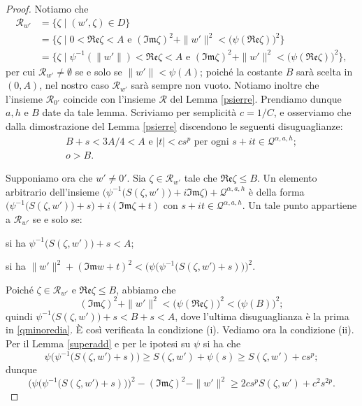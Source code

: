 \begin{proof}
    Notiamo che
    \begin{align*}
        \mathcal{R}_{w'}&=\{\zeta\mid (w',\zeta)\in D\}\\
        &=\{\zeta\mid0<\mathfrak{Re}\zeta<A\text{ e }(\mathfrak{Im}\zeta)^2+\|w'\|^2<\big(\psi(\mathfrak{Re}\zeta)\big)^2\}\\
        &=\{\zeta\mid \psi^{-1}(\|w'\|)<\mathfrak{Re}\zeta<A\text{ e }(\mathfrak{Im}\zeta)^2+\|w'\|^2<\big(\psi(\mathfrak{Re}\zeta)\big)^2\},
    \end{align*}
    per cui $\mathcal{R}_{w'}\not=\emptyset$ se e solo se $\|w'\|<\psi(A)$; poiché la costante $B$ sarà scelta in $(0,A)$, nel nostro caso $\mathcal{R}_{w'}$ sarà sempre non vuoto. Notiamo inoltre che l'insieme $\mathcal{R}_{0'}$ coincide con l'insieme $\mathcal{R}$ del Lemma \ref{psierre}. Prendiamo dunque $a,h$ e $B$ date da tale lemma. Scriviamo per semplicità $c=1/C$, e osserviamo che dalla dimostrazione del Lemma \ref{psierre} discendono le seguenti disuguaglianze:
    \begin{gather}
        B+s<3A/4<A\text{ e }|t|<cs^p\text{ per ogni }s+it\in\mathcal{Q}^{\alpha,a,h};\label{qminoredia}\\
        o>B.\label{obbi}
    \end{gather}

    Supponiamo ora che $w'\not=0'$. Sia $\zeta\in\mathcal{R}_{w'}$ tale che $\mathfrak{Re}\zeta\le B$. Un elemento arbitrario dell'insieme $\Big(\psi^{-1}\big(S(\zeta,w')\big)+i\mathfrak{Im}\zeta\Big)+\mathcal{Q}^{\alpha,a,h}$ è della forma $\Big(\psi^{-1}\big(S(\zeta,w')\big)+s\Big)+i(\mathfrak{Im}\zeta+t)$ con $s+it\in\mathcal{Q}^{\alpha,a,h}$. Un tale punto appartiene a $\mathcal{R}_{w'}$ se e solo se:
    \begin{nlist}
        \item si ha $\psi^{-1}\big(S(\zeta,w')\big)+s<A$;
        \item si ha $\|w'\|^2+(\mathfrak{Im}w+t)^2<\bigg(\psi\Big(\psi^{-1}\big(S(\zeta,w'\big)+s)\Big)\bigg)^2$.
    \end{nlist}

    Poiché $\zeta\in\mathcal{R}_{w'}$ e $\mathfrak{Re}\zeta\le B$, abbiamo che
    $$(\mathfrak{Im}\zeta)^2+\|w'\|^2<\big(\psi(\mathfrak{Re}\zeta)\big)^2<\big(\psi(B)\big)^2;$$
    quindi $\psi^{-1}\big(S(\zeta,w')\big)+s<B+s<A$, dove l'ultima disuguaglianza è la prima in \eqref{qminoredia}. È così verificata la condizione (i). Vediamo ora la condizione (ii). Per il Lemma \ref{superadd} e per le ipotesi su $\psi$ si ha che
    $$\psi\Big(\psi^{-1}\big(S(\zeta,w'\big)+s)\Big)\ge S(\zeta,w')+\psi(s) \ge S(\zeta,w')+cs^p;$$
    dunque
    $$\bigg(\psi\Big(\psi^{-1}\big(S(\zeta,w'\big)+s)\Big)\bigg)^2-(\mathfrak{Im}\zeta)^2-\|w'\|^2\ge 2cs^pS(\zeta,w')+c^2s^{2p}.$$


\end{proof}
